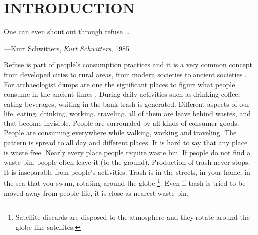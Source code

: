 \chapter{INTRODUCTION}




\begin{singlespace}
\epigraph{One can even shout out through refuse \ldots}{\hfill---Kurt Schwitters, \textit{Kurt Schwitters}, 1985}
\end{singlespace}





%
%
Refuse is part of people's consumption practices and it is a very common concept from developed cities to rural areas, from modern societies to ancient societies \cite[p.33]{rathje1992rubbish}.  For archaeologist dumps are one the significant places to figure what people consume in the ancient times \cite{rathje1992rubbish}.
 During daily activities such as drinking coffee, eating beverages, waiting in the bank trash is generated. Different aspects of our life, eating, drinking, working, traveling, all of them are leave behind wastes, and that become invisible. People are surrounded by all kinds of consumer goods. People are consuming everywhere while walking, working and traveling. The pattern is spread to all day and different places. It is hard to say that any place is waste free. Nearly every place people require waste bin. If people do not find a waste bin, people often leave it (to the ground). Production of trash never stops. It is inseparable from people's activities.
Trash is in the streets, in your home, in the sea that you swam, rotating around the globe \footnote{Satellite discards are disposed to the atmosphere and they rotate around the globe like satellites.}. Even if trash is tried to be moved away from people life, it is close as nearest waste bin.






